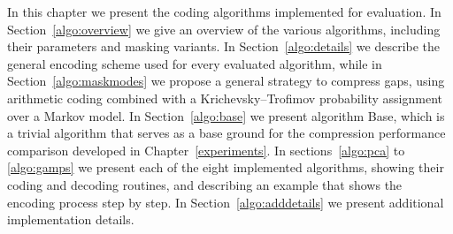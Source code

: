 





In this chapter we present the coding algorithms implemented for evaluation. In Section~\ref{algo:overview} we give an overview of the various algorithms, including their parameters and masking variants. In Section~\ref{algo:details} we describe the general encoding scheme used for every evaluated algorithm, while in Section~\ref{algo:maskmodes} we propose a general strategy to compress gaps, using arithmetic coding combined with a Krichevsky–Trofimov probability assignment over a Markov model. In Section~\ref{algo:base} we present algorithm Base, which is a trivial algorithm that serves as a base ground for the compression performance comparison developed in Chapter~\ref{experiments}. In sections~\ref{algo:pca} to \ref{algo:gamps} we present each of the eight implemented algorithms, showing their coding and decoding routines, and describing an example that shows the encoding process step by step. In Section~\ref{algo:adddetails} we present additional implementation details. 

